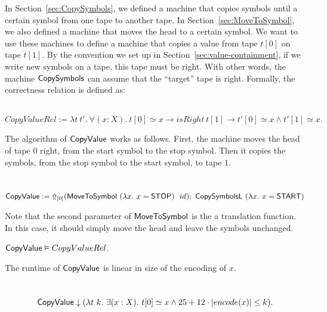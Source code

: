 In Section~\ref{sec:CopySymbols}, we defined a machine that copies symbols until a certain symbol from one tape to another tape.  In
Section~\ref{sec:MoveToSymbol}, we also defined a machine that moves the head to a certain symbol.  We want to use these machines to define a machine
that copies a value from tape $t[0]$ on tape $t[1]$.  By the convention we set up in Section~\ref{sec:value-containment}, if we write new symbols on a
tape, this tape must be right.  With other words, the machine $\MS{CopySymbols}$ can assume that the ``target'' tape is right.  Formally, the
correctness relation is defined as:
%
\begin{definition}
  \label{def:CopyValue_Rel}
  ~
  \[
    CopyValueRel := \lambda t~t'.~\forall (x:X).~t[0] \simeq x \rightarrow isRight~t[1] \rightarrow t'[0] \simeq x \land t'[1] \simeq x.
  \]
\end{definition}

The algorithm of $\MS{CopyValue}$ works as follows.  First, the machine moves the head of tape $0$ right, from the start symbol to the stop symbol.
Then it copies the symbols, from the stop symbol to the start symbol, to tape $1$.

\begin{definition}[$\MS{CopyValue}$][CopyValue]
  \label{def:CopyValue}
  ~
  \small
  \[
    \MS{CopyValue} := \LiftTapes{(\MS{MoveToSymbol}~(\lambda x.~x=\MS{STOP})~~id)}{\Vector{0}} \Seq \MS{CopySymbolsL}~(\lambda x.~x=\MS{START})
  \]
\end{definition}

Note that the second parameter of $\MS{MoveToSymbol}$ is the a translation function.  In this case, it should simply move the head and leave the
symbols unchanged.

\begin{lemma}
  \label{lem:CopyValue_Realise}
  $\MS{CopyValue} \Realise CopyValueRel$.
\end{lemma}

The runtime of $\MS{CopyValue}$ is linear in size of the encoding of $x$.
\begin{lemma}
  \label{lem:CopyValue_TerminatesIn}
  ~
  \[
    \MS{CopyValue} \TerminatesIn (\lambda t~k.~\exists(x:X).~t[0] \simeq x \land 25 + 12 \cdot \size{x} \leq k).
  \]
\end{lemma}

